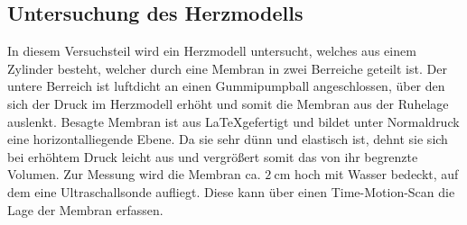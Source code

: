 \subsection{Untersuchung des Herzmodells}
In diesem Versuchsteil wird ein Herzmodell untersucht, welches aus einem Zylinder besteht, welcher durch eine Membran in zwei Berreiche geteilt ist. Der untere Berreich ist luftdicht an einen Gummipumpball angeschlossen, über den sich der Druck im Herzmodell erhöht und somit die Membran aus der Ruhelage auslenkt.
Besagte Membran ist aus \LaTeX gefertigt und bildet unter Normaldruck eine horizontalliegende Ebene. Da sie sehr dünn und elastisch ist, dehnt sie sich bei erhöhtem Druck leicht aus und vergrößert somit das von ihr begrenzte Volumen.
Zur Messung wird die Membran ca. $\SI{2}{\centi\meter}$ hoch mit Wasser bedeckt, auf dem eine Ultraschallsonde aufliegt. Diese kann über einen Time-Motion-Scan die Lage der Membran erfassen.
